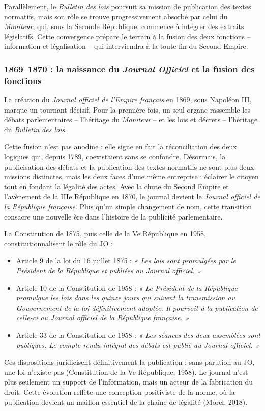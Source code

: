 Parallèlement, le \emph{Bulletin des lois} poursuit sa mission de publication des textes normatifs, mais son rôle se trouve progressivement absorbé par celui du \emph{Moniteur}, qui, sous la Seconde République, commence à intégrer des extraits législatifs. Cette convergence prépare le terrain à la fusion des deux fonctions – information et légalisation – qui interviendra à la toute fin du Second Empire.

\subsubsection{1869–1870 : la naissance du \emph{Journal Officiel} et la fusion des fonctions}

La création du \emph{Journal officiel de l’Empire français} en 1869, sous Napoléon III, marque un tournant décisif. Pour la première fois, un seul organe rassemble les débats parlementaires -- l'héritage du \emph{Moniteur} -- et les lois et décrets -- l'héritage du \emph{Bulletin des lois}.

Cette fusion n’est pas anodine : elle signe en fait la réconciliation des deux logiques qui, depuis 1789, coexistaient sans se confondre. Désormais, la publicisation des débats et la publication des textes normatifs ne sont plus deux missions distinctes, mais les deux faces d’une même entreprise : éclairer le citoyen tout en fondant la légalité des actes. Avec la chute du Second Empire et l’avènement de la IIIe République en 1870, le journal devient le \emph{Journal officiel de la République française}. Plus qu’un simple changement de nom, cette transition consacre une nouvelle ère dans l’histoire de la publicité parlementaire. 

La Constitution de 1875, puis celle de la Ve République en 1958, constitutionnalisent le rôle du JO :

\begin{itemize}
\item Article 9 de la loi du 16 juillet 1875 : \emph{« Les lois sont promulgées par le Président de la République et publiées au Journal officiel. »}
\item Article 10 de la Constitution de 1958 : \emph{« Le Président de la République promulgue les lois dans les quinze jours qui suivent la transmission au Gouvernement de la loi définitivement adoptée. Il pourvoit à la publication de celle-ci au Journal officiel de la République française. »}
\item Article 33 de la Constitution de 1958 : \emph{« Les séances des deux assemblées sont publiques. Le compte rendu intégral des débats est publié au Journal officiel. »}

\end{itemize}
Ces dispositions juridicisent définitivement la publication : sans parution au JO, une loi n’existe pas (Constitution de la Ve République, 1958). Le journal n’est plus seulement un support de l’information, mais un acteur de la fabrication du droit. Cette évolution reflète une conception positiviste de la norme, où la publication devient un maillon essentiel de la chaîne de légalité (Morel, 2018).

